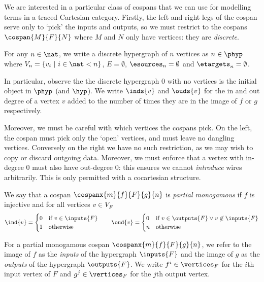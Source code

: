 \documentclass[10pt]{article}
\begin{document}
We are interested in a particular class of cospans that we can use for modelling terms in a traced Cartesian category.
Firstly, the left and right legs of the cospan serve only to `pick' the inputs and outputs, so we must restrict to the cospans $\cospan{M}{F}{N}$ where $M$ and $N$ only have vertices: they are \emph{discrete}.

\begin{definition}
    For any $n \in \nat$, we write a discrete hypergraph of $n$ vertices as $n \in \phyp$ where $V_n = \{v_i \ |\ i \in \nat < n\}$, $E = \emptyset$, $\esources_n = \emptyset$ and $\etargets_n = \emptyset$.  
\end{definition}

In particular, observe the the discrete hypergraph $0$ with no vertices is the initial object in $\phyp$ (and $\hyp$).
We write $\inds{v}$ and $\ouds{v}$ for the in and out degree of a vertex $v$ added to the number of times they are in the image of $f$ or $g$ respectively.

Moreover, we must be careful with which vertices the cospans pick.
On the left, the cospan must pick only the `open' vertices, and must leave no dangling vertices.
Conversely on the right we have no such restriction, as we may wish to copy or discard outgoing data.
Moreover, we must enforce that a vertex with in-degree $0$ must also have out-degree $0$: this ensures we cannot \emph{introduce} wires arbitrarily. This is only permitted with a cocartesian structure.

\begin{definition}
    We say that a cospan $\cospanx{m}{f}{F}{g}{n}$ is \emph{partial monogamous} if $f$ is injective and for all vertices $v \in V_F$ 
    \[\ind{v} = \begin{cases}
        0 & \text{if}\ v \in \inputs{F} \\
        1 & \text{otherwise}
    \end{cases}
    \qquad
    \oud{v} = \begin{cases}
        0 & \text{if}\ v \in \outputs{F} \vee v \not\in \inputs{F} \\
        n & \text{otherwise}
    \end{cases}\]
\end{definition}

For a partial monogamous cospan $\cospanx{m}{f}{F}{g}{n}$, we refer to the image of $f$ as the \emph{inputs} of the hypergraph $\inputs{F}$ and the image of $g$ as the \emph{outputs} of the hypergraph $\outputs{F}$.
We write $f^i \in \vertices_F$ for the $i$th input vertex of $F$ and $g^j \in \vertices_F$ for the $j$th output vertex.
\end{document}

